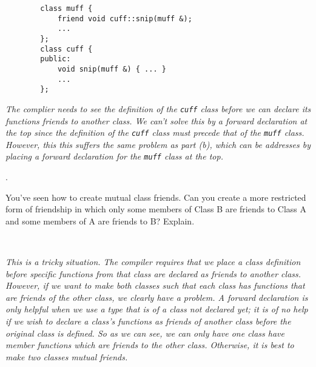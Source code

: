 \documentclass{amsart}
\begin{document}
\begin{minipage}[t]{11.5 cm}
	\begin{verbatim}
		class muff {
		    friend void cuff::snip(muff &);
		    ...
		};
		class cuff {
		public:
		    void snip(muff &) { ... }
		    ...
		};
	\end{verbatim}
	{\slshape 
		The complier needs to see the definition of the \verb+cuff+ class
		before we can declare its functions friends to another class. 
		We can't solve this by a forward declaration at the top since
		the definition of the \verb+cuff+ class must precede that of 
		the \verb+muff+ class. 
		However, this this suffers the same problem as part (b), which 
		can be addresses by placing a forward declaration for the
		\verb+muff+ class at the top.
	} \\
	{} %
\end{minipage}
\vfill
\newpage

\phantom{\quad}\vfill
{}. 
\begin{minipage}[t]{11.5 cm}
	You've seen how to create mutual class friends. Can you create a more restricted form of friendship in which only some members of Class B are friends to Class A and some members of A are friends to B? Explain.
\end{minipage} \\[1ex]
\phantom{2. } 
\begin{minipage}[t]{11.5 cm}
	{\slshape 
		This is a tricky situation. 
		The compiler requires that we place a class definition
		before specific functions from that class are declared 
		as friends to another class. 
		However, if we want to make both classes such that each 
		class has functions that are friends of the other class,
		we clearly have a problem.
		A forward declaration is only helpful when we use a type
		that is of a class not declared yet;
		it is of no help if we wish to declare a class's functions
		as friends of another class before the original class
		is defined. 
		So as we can see, we can only have one class have member
		functions which are friends to the other class. 
		Otherwise, it is best to make two classes mutual friends. 
	} 
\end{minipage} 
\vfill
\end{document}

